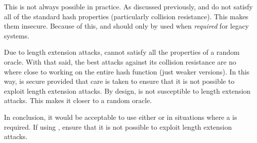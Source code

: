 This is not always possible in practice.
As discussed previously, \MDFive{} and \ShaOne{} do not satisfy
all of the standard hash properties (particularly collision resistance).
This makes them insecure.
Because of this, \MDFive{} and \ShaOne{} should only by used
when \emph{required} for legacy systems.

Due to length extension attacks, \ShaTwo{} cannot satisfy
all the properties of a \gls{random oracle}.
With that said, the best attacks against its collision resistance
are no where close to working on the entire \gls{hash function}
(just weaker versions).
In this way, \ShaTwo{} is secure provided that care is taken
to ensure that it is not possible to exploit length extension attacks.
By design, \ShaThree{} is not susceptible to length extension attacks.
This makes it closer to a \gls{random oracle}.

In conclusion, it would be acceptable to use either \ShaTwo{} or \ShaThree{}
in situations where a  is required.
If using \ShaTwo{}, ensure that it is not possible
to exploit length extension attacks.
